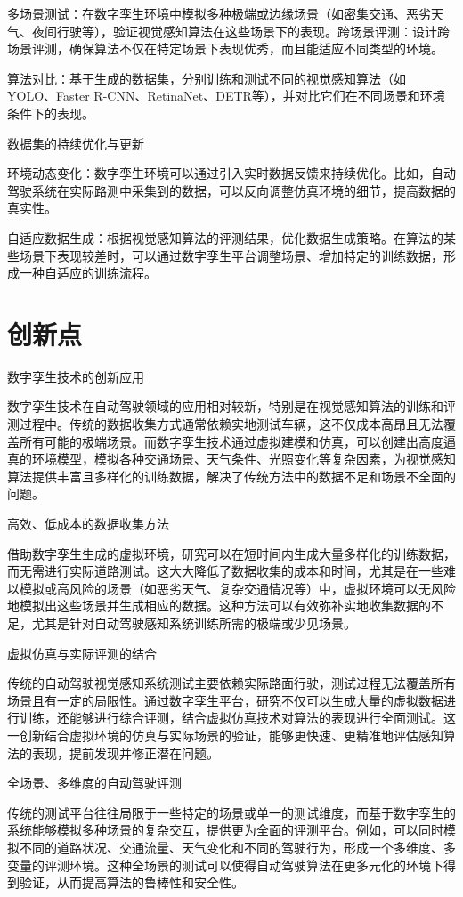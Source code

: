 多场景测试：在数字孪生环境中模拟多种极端或边缘场景（如密集交通、恶劣天气、夜间行驶等），验证视觉感知算法在这些场景下的表现。跨场景评测：设计跨场景评测，确保算法不仅在特定场景下表现优秀，而且能适应不同类型的环境。

算法对比：基于生成的数据集，分别训练和测试不同的视觉感知算法（如 YOLO、Faster R-CNN、RetinaNet、DETR等），并对比它们在不同场景和环境条件下的表现。

数据集的持续优化与更新

环境动态变化：数字孪生环境可以通过引入实时数据反馈来持续优化。比如，自动驾驶系统在实际路测中采集到的数据，可以反向调整仿真环境的细节，提高数据的真实性。

自适应数据生成：根据视觉感知算法的评测结果，优化数据生成策略。在算法的某些场景下表现较差时，可以通过数字孪生平台调整场景、增加特定的训练数据，形成一种自适应的训练流程。



\section{创新点}

数字孪生技术的创新应用

数字孪生技术在自动驾驶领域的应用相对较新，特别是在视觉感知算法的训练和评测过程中。传统的数据收集方式通常依赖实地测试车辆，这不仅成本高昂且无法覆盖所有可能的极端场景。而数字孪生技术通过虚拟建模和仿真，可以创建出高度逼真的环境模型，模拟各种交通场景、天气条件、光照变化等复杂因素，为视觉感知算法提供丰富且多样化的训练数据，解决了传统方法中的数据不足和场景不全面的问题。

高效、低成本的数据收集方法

借助数字孪生生成的虚拟环境，研究可以在短时间内生成大量多样化的训练数据，而无需进行实际道路测试。这大大降低了数据收集的成本和时间，尤其是在一些难以模拟或高风险的场景（如恶劣天气、复杂交通情况等）中，虚拟环境可以无风险地模拟出这些场景并生成相应的数据。这种方法可以有效弥补实地收集数据的不足，尤其是针对自动驾驶感知系统训练所需的极端或少见场景。

虚拟仿真与实际评测的结合

传统的自动驾驶视觉感知系统测试主要依赖实际路面行驶，测试过程无法覆盖所有场景且有一定的局限性。通过数字孪生平台，研究不仅可以生成大量的虚拟数据进行训练，还能够进行综合评测，结合虚拟仿真技术对算法的表现进行全面测试。这一创新结合虚拟环境的仿真与实际场景的验证，能够更快速、更精准地评估感知算法的表现，提前发现并修正潜在问题。

全场景、多维度的自动驾驶评测

传统的测试平台往往局限于一些特定的场景或单一的测试维度，而基于数字孪生的系统能够模拟多种场景的复杂交互，提供更为全面的评测平台。例如，可以同时模拟不同的道路状况、交通流量、天气变化和不同的驾驶行为，形成一个多维度、多变量的评测环境。这种全场景的测试可以使得自动驾驶算法在更多元化的环境下得到验证，从而提高算法的鲁棒性和安全性。

